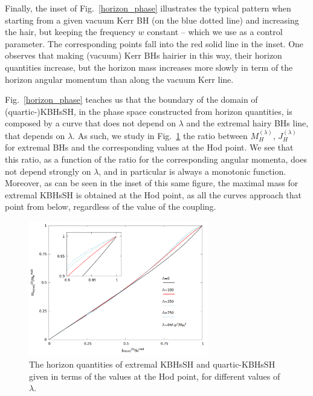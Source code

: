 Finally, the inset of Fig.~\ref{horizon_phase} illustrates the typical pattern when starting from a given vacuum Kerr BH (on the blue dotted line) and increasing the hair, but keeping the frequency $w$ constant -- which we use as a control parameter. The corresponding points fall into the red solid line in the inset. One observes that making (vacuum) Kerr BHs hairier in this way, their horizon quantities increase, but the horizon mass increases more slowly in term of the horizon angular momentum than along the vacuum Kerr line. 


Fig.~\ref{horizon_phase} teaches us that the boundary of the domain of (quartic-)KBHsSH, in the phase space constructed from horizon quantities, is composed by a curve that does not depend on $\lambda$ and the extremal hairy BHs line, that depends on $\lambda$.  As such, we study in Fig.~\ref{horizon_ratios}
the ratio between $M_H^{(\lambda)}$, $J_H^{(\lambda)}$ for extremal BHs and the corresponding values at the Hod point. We see that this ratio, as a function of the ratio for the corresponding angular momenta, does not depend strongly on $\lambda$, and in particular is always a monotonic function. Moreover, as can be seen in the inset of this same figure, the maximal mass for extremal KBHsSH is obtained at the Hod point, as all the curves approach that point from below, regardless of the value of the coupling.

\begin{figure}[h!]
  \begin{center}
    \includegraphics[width=0.7\textwidth]{papers/selfInteractions/horizon-ratios.png}
      \end{center}
      \caption{ The horizon quantities of extremal  KBHsSH and quartic-KBHsSH given in terms of the values at the Hod point, for different values of $\lambda$.}
  \label{horizon_ratios}
\end{figure}

